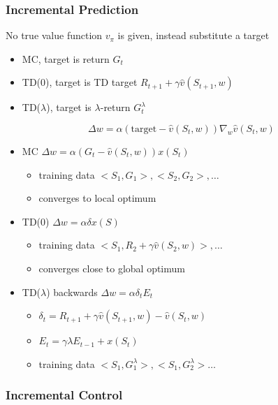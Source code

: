 \documentclass[]{article}
\theoremstyle{definition}
\begin{document}
\subsubsection{Incremental Prediction}%
\label{ssub:incremental_prediction}
No true value function $v_\pi$ is given, instead substitute a target
\begin{itemize}
    \item MC, target is return $G_t$
    \item TD(0), target is TD target $R_{t+1} + \gamma \hat v(S_{t+1}, w)$
    \item TD($\lambda$), target is $\lambda$-return $G_t^\lambda$
\end{itemize}
\begin{equation*}
    \Delta w = \alpha ( \text{target} - \hat v(S_t, w)) \nabla_w \hat v(S_t, w)
\end{equation*}
\begin{itemize}
    \item MC $\Delta w = \alpha (G_t - \hat v(S_t, w)) x(S_t)$
        \begin{itemize}
            \item training data $<S_1, G_1>, <S_2, G_2>, \ldots$
            \item converges to local optimum
        \end{itemize}
    \item TD(0) $\Delta w = \alpha \delta x(S)$
        \begin{itemize}
            \item training data $<S_1, R_2 + \gamma \hat v(S_2, w)>, \ldots$
            \item converges close to global optimum
        \end{itemize}
    \item TD($\lambda$) backwards $\Delta w = \alpha \delta_t E_t$
        \begin{itemize}
            \item $\delta_t = R_{t+1} + \gamma \hat v(S_{t+1}, w) - \hat v(S_t, w)$
            \item $E_t = \gamma \lambda E_{t-1} + x(S_t)$
            \item training data $<S_1, G_1^\lambda>, <S_1, G_2^\lambda> \ldots$
        \end{itemize}
\end{itemize}

\subsubsection{Incremental Control}%
\label{ssub:incremental_control}
\end{document}
